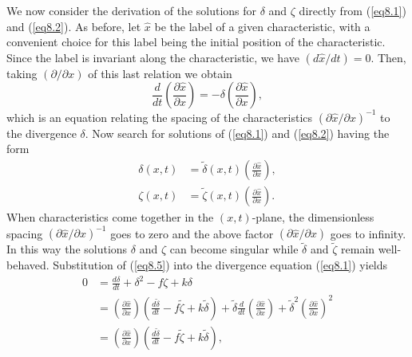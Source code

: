 \documentclass[10pt]{article}
\begin{document}
    We now consider the derivation of the solutions for $\delta$ and $\zeta$
directly from (\ref{eq8.1}) and (\ref{eq8.2}). As before, let
$\hat{x}$ be the label of a given characteristic, with a convenient choice
for this label being the initial position of the characteristic. Since the label
is invariant along the characteristic, we have $(d\hat{x}/dt)=0$. Then, taking
$(\partial/\partial x)$ of this last relation we obtain
\begin{equation}                                    %
            \frac{d}{dt}\left(\frac{\partial\hat{x}}{\partial x}\right)
         = -\delta \left(\frac{\partial\hat{x}}{\partial x}\right),
\label{eq8.4}
\end{equation}
which is an equation relating the spacing of the characteristics
$(\partial\hat{x}/\partial x)^{-1}$ to the divergence $\delta$. Now search for
solutions of (\ref{eq8.1}) and (\ref{eq8.2}) having the form
\begin{equation}                                    %
  \begin{split}
       \delta(x,t) &= \tilde{\delta}(x,t)\left(\frac{\partial\hat{x}}{\partial x}\right), \\
       \zeta (x,t) &= \tilde{\zeta }(x,t)\left(\frac{\partial\hat{x}}{\partial x}\right).
  \end{split}
\label{eq8.5}
\end{equation}
When characteristics come together in the $(x,t)$-plane, the dimensionless spacing
$(\partial\hat{x}/\partial x)^{-1}$ goes to zero and the above factor
$(\partial\hat{x}/\partial x)$ goes to infinity. In this way the solutions $\delta$
and $\zeta$ can become singular while $\tilde{\delta}$ and $\tilde{\zeta}$ remain
well-behaved. Substitution of (\ref{eq8.5}) into the divergence equation (\ref{eq8.1})
yields
\begin{equation}                                    %
  \begin{split}
    0&= \frac{d\delta}{dt} + \delta^2 - f\zeta + k\delta      \\
     &= \left(\frac{\partial\hat{x}}{\partial x}\right)
        \left(\frac{d\tilde{\delta}}{dt} - f\tilde{\zeta} + k\tilde{\delta}\right)
      + \tilde{\delta} \frac{d}{dt}\left(\frac{\partial\hat{x}}{\partial x}\right)
      + \tilde{\delta}^2\left(\frac{\partial\hat{x}}{\partial x}\right)^2     \\
     &= \left(\frac{\partial\hat{x}}{\partial x}\right)
        \left(\frac{d\tilde{\delta}}{dt} - f\tilde{\zeta} + k\tilde{\delta}\right),
  \end{split}
\label{eq8.6}
\end{equation}
\end{document}
